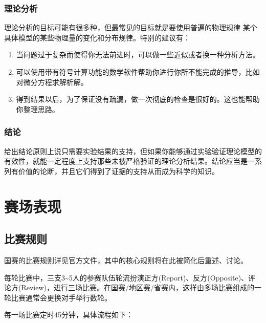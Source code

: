 \documentclass[a4paper,10pt,english]{sphinxmanual}
\begin{document}
\subsection{理论分析}
\label{\detokenize{5. Research:id8}}
理论分析的目标可能有很多种，但最常见的目标就是要使用普遍的物理规律  某个具体模型的某些物理量的变化和分布规律。特别的建议有：
\begin{enumerate}
\item {} 
当问题过于复杂而使得你无法前进时，可以做一些近似或者换一种分析方法。

\item {} 
可以使用带有符号计算功能的数学软件帮助你进行你所不能完成的推导，比如对微分方程求解析解。

\item {} 
得到结果以后，为了保证没有疏漏，做一次彻底的检查是很好的。这也能帮助你整理思路。

\end{enumerate}


\subsection{结论}
\label{\detokenize{5. Research:id9}}
给出结论原则上说只需要实验结果的支持，但如果你能够通过实验验证理论模型的有效性，就能一定程度上支持那些未被严格验证的理论分析结果。结论应当是一系列有价值的论断，并且它们得到了证据的支持从而成为科学的知识。


\chapter{赛场表现}
\label{\detokenize{6. Tournament::doc}}\label{\detokenize{6. Tournament:id1}}

\section{比赛规则}
\label{\detokenize{6. Tournament:id2}}
国赛的比赛规则详见官方文件，其中的核心规则将在此被简化后重述、讨论。

每轮比赛中，三支3\textasciitilde{}5人的参赛队伍轮流扮演正方(Report)、反方(Opposite)、评论方(Review)，进行三场比赛。在国赛/地区赛/省赛内，这样由多场比赛组成的一轮比赛通常会更换对手举行数轮。

每一场比赛定时45分钟，具体流程如下：
\end{document}
